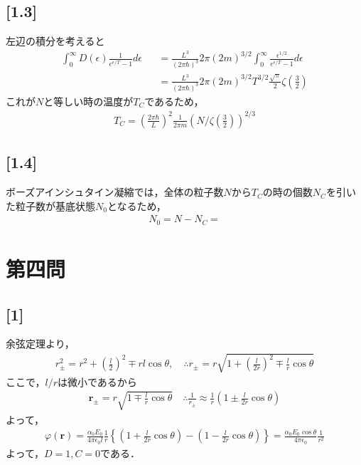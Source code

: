 \documentclass[12pt,dvipdfmx]{jsarticle}
\begin{document}
\subsection*{\large{[1.3]}}
左辺の積分を考えると
\begin{eqnarray}
  \int_0^{\infty}D(\epsilon)\frac{1}{e^{\epsilon/T}-1}d\epsilon &&= \frac{L^3}{(2\pi\hbar)^3}2\pi (2m)^{3/2} \int_0^{\infty} \frac{\epsilon^{1/2}}{e^{\epsilon/T}-1}d\epsilon\\
  &&= \frac{L^3}{(2\pi\hbar)^3}2\pi (2m)^{3/2} T^{3/2} \frac{\sqrt{\pi}}{2}\zeta\left( \frac{3}{2} \right)
\end{eqnarray}
これが$N$と等しい時の温度が$T_C$であるため，
\begin{eqnarray}
  T_C = \left( \frac{2\pi\hbar}{L} \right)^2 \frac{1}{2\pi m} \left( N/\zeta\left( \frac{3}{2} \right) \right)^{2/3}
\end{eqnarray}
\subsection*{\large{[1.4]}}
ボーズアインシュタイン凝縮では，全体の粒子数$N$から$T_C$の時の個数$N_C$を引いた粒子数が基底状態$N_0$となるため，
\begin{eqnarray}
  N_0 = N-N_C = 
\end{eqnarray}

\newpage
\section*{\Large{第四問}}
\subsection*{\large{[1]}}
余弦定理より，
\begin{eqnarray}
  r_{\pm}^2 = r^2 +\left( \frac{l}{2} \right)^2 \mp rl\cos\theta, \quad\therefore r_{\pm} = r\sqrt{ 1 + \left( \frac{l}{2r} \right)^2 \mp\frac{l}{r}\cos\theta }
\end{eqnarray}
ここで，$l/r$は微小であるから
\begin{eqnarray}
  \bm{r}_{\pm} = r\sqrt{ 1 \mp\frac{l}{r}\cos\theta } \quad\therefore \frac{1}{r_{\pm}} \approx \frac{1}{r} \left( 1 \pm\frac{l}{2r}\cos\theta \right)
\end{eqnarray}
よって，
\begin{eqnarray}
  \varphi(\bm{r})= \frac{\alpha_0 E_0 }{4\pi\epsilon_0 l} \frac{1}{r} \left\{ \left( 1 +\frac{l}{2r}\cos\theta \right)-\left( 1 -\frac{l}{2r}\cos\theta \right) \right\} = \frac{\alpha_0 E_0\cos\theta}{4\pi\epsilon_0}\frac{1}{r^2}
\end{eqnarray}
よって，$D=1,C=0$である．
\end{document}
